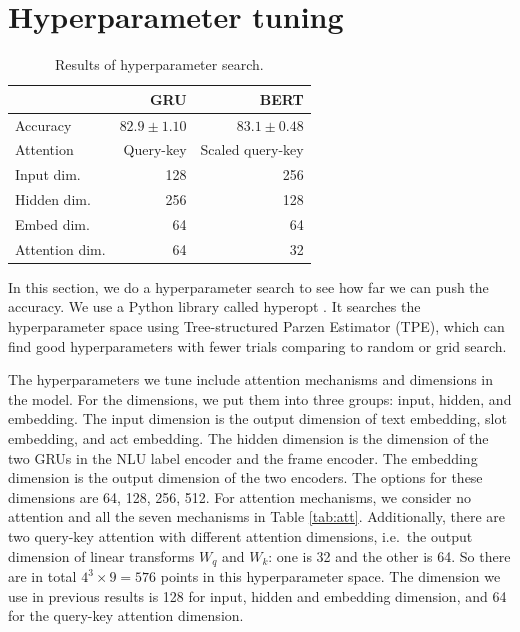 \section{Hyperparameter tuning}
\begin{table}
    \centering
    \caption[Results of hyperparameter search]{Results of hyperparameter search.}
    \label{tab:hyperopt}
    \begin{tabular}{lrr}
        \toprule
         & GRU & BERT \\
        \midrule
        Accuracy & $82.9 \pm 1.10$ & $83.1 \pm 0.48$ \\
        \midrule
        Attention & Query-key & Scaled query-key \\
        Input dim. & 128 & 256 \\
        Hidden dim. & 256 & 128 \\
        Embed dim. & 64 & 64 \\
        Attention dim. & 64 & 32 \\
        \bottomrule
    \end{tabular}
\end{table}

In this section, we do a hyperparameter search to see how far we can push the accuracy. We use a Python library called hyperopt \cite{bergstra2013hyperopt}. It searches the hyperparameter space using Tree-structured Parzen Estimator (TPE), which can find good hyperparameters with fewer trials comparing to random or grid search.

The hyperparameters we tune include attention mechanisms and dimensions in the model. For the dimensions, we put them into three groups: input, hidden, and embedding. The input dimension is the output dimension of text embedding, slot embedding, and act embedding. The hidden dimension is the dimension of the two GRUs in the NLU label encoder and the frame encoder. The embedding dimension is the output dimension of the two encoders. The options for these dimensions are 64, 128, 256, 512. For attention mechanisms, we consider no attention and all the seven mechanisms in Table \ref{tab:att}. Additionally, there are two query-key attention with different attention dimensions, i.e.\ the output dimension of linear transforms $W_q$ and $W_k$: one is 32 and the other is 64. So there are in total $4^3 \times 9 = 576$ points in this hyperparameter space. The dimension we use in previous results is 128 for input, hidden and embedding dimension, and 64 for the query-key attention dimension.

